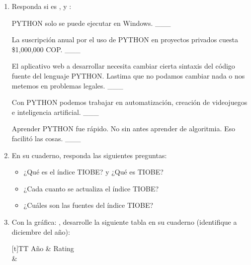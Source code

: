 \documentclass[letterpaper,10pt,spanish]{sphinxmanual}
\begin{document}
\begin{enumerate}
\item {} 
\sphinxAtStartPar
Responda si es ,  y :

\sphinxAtStartPar
{} PYTHON solo se puede ejecutar en Windows. \_\_\_

\sphinxAtStartPar
{} La suscripción anual por el uso de PYTHON en proyectos privados cuesta \$1,000,000 COP. \_\_\_

\sphinxAtStartPar
{} El aplicativo web a desarrollar necesita cambiar cierta sintaxis del código fuente del lenguaje PYTHON. Lastima que no podamos cambiar nada o nos metemos en problemas legales. \_\_\_

\sphinxAtStartPar
{} Con PYTHON podemos trabajar en automatización, creación de videojuegos e inteligencia artificial. \_\_\_

\sphinxAtStartPar
{} Aprender PYTHON fue rápido. No sin antes aprender de algoritmia. Eso facilitó las cosas. \_\_\_

\item {} 
\sphinxAtStartPar
En su cuaderno, responda las siguientes preguntas:
\begin{itemize}
\item {} 
\sphinxAtStartPar
¿Qué es el índice TIOBE? y ¿Qué es TIOBE?

\item {} 
\sphinxAtStartPar
¿Cada cuanto se actualiza el índice TIOBE?

\item {} 
\sphinxAtStartPar
¿Cuáles son las fuentes del índice TIOBE?

\end{itemize}

\item {} 
\sphinxAtStartPar
Con la gráfica: , desarrolle la siguiente tabla en su cuaderno (identifique a diciembre del año):


\begin{savenotes}\sphinxattablestart
\sphinxthistablewithglobalstyle
\centering
\begin{tabulary}{\linewidth}[t]{TT}
\sphinxtoprule
\sphinxstyletheadfamily 
\sphinxAtStartPar
Año
&\sphinxstyletheadfamily 
\sphinxAtStartPar
Rating
\\
\sphinxmidrule
\sphinxtableatstartofbodyhook
{}
&
\sphinxAtStartPar


\end{tabulary}
\end{savenotes}
\end{enumerate}
\end{document}
